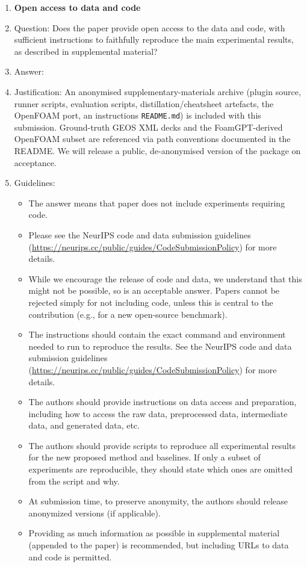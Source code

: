 \begin{enumerate}
\item {\bf Open access to data and code}
    \item[] Question: Does the paper provide open access to the data and code, with sufficient instructions to faithfully reproduce the main experimental results, as described in supplemental material?
    \item[] Answer: \answerYes{}
    \item[] Justification: An anonymised supplementary-materials archive (plugin source, runner scripts, evaluation scripts, distillation/cheatsheet artefacts, the OpenFOAM port, an instructions \texttt{README.md}) is included with this submission. Ground-truth GEOS XML decks and the FoamGPT-derived OpenFOAM subset are referenced via path conventions documented in the README. We will release a public, de-anonymised version of the package on acceptance.
    \item[] Guidelines:
    \begin{itemize}
        \item The answer \answerNA{} means that paper does not include experiments requiring code.
        \item Please see the NeurIPS code and data submission guidelines (\url{https://neurips.cc/public/guides/CodeSubmissionPolicy}) for more details.
        \item While we encourage the release of code and data, we understand that this might not be possible, so \answerNo{} is an acceptable answer. Papers cannot be rejected simply for not including code, unless this is central to the contribution (e.g., for a new open-source benchmark).
        \item The instructions should contain the exact command and environment needed to run to reproduce the results. See the NeurIPS code and data submission guidelines (\url{https://neurips.cc/public/guides/CodeSubmissionPolicy}) for more details.
        \item The authors should provide instructions on data access and preparation, including how to access the raw data, preprocessed data, intermediate data, and generated data, etc.
        \item The authors should provide scripts to reproduce all experimental results for the new proposed method and baselines. If only a subset of experiments are reproducible, they should state which ones are omitted from the script and why.
        \item At submission time, to preserve anonymity, the authors should release anonymized versions (if applicable).
        \item Providing as much information as possible in supplemental material (appended to the paper) is recommended, but including URLs to data and code is permitted.
    \end{itemize}



\end{enumerate}
